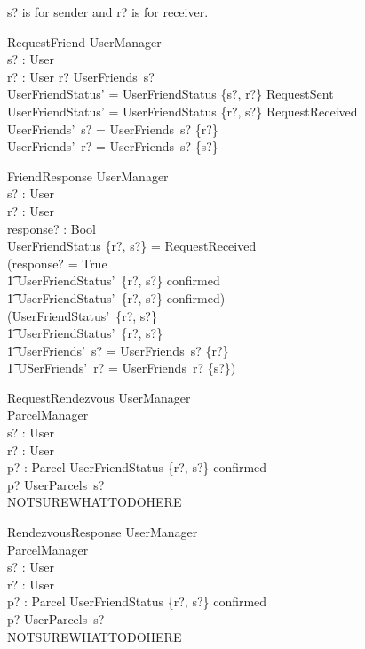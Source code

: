 \documentclass{article}
\begin{document}
s? is for sender and r? is for receiver.\\

\begin{schema}{RequestFriend}
	\Delta UserManager\\
	s? : User\\
	r? : User
	\where
	r? \notin UserFriends~s?\\
	UserFriendStatus' = UserFriendStatus \cup \{s?, r?\} \mapsto RequestSent\\
	UserFriendStatus' = UserFriendStatus \cup \{r?, s?\} \mapsto RequestReceived\\
	UserFriends'~s? = UserFriends~s? \cup \{r?\}\\
	UserFriends'~r? = UserFriends~s? \cup \{s?\}
\end{schema}

\begin{schema}{FriendResponse}
	\Delta UserManager\\
	s? : User\\
	r? : User\\
	response? : Bool\\
	\where
	UserFriendStatus \{r?, s?\} = RequestReceived\\
	(response? = True \land\\ 
		\t1 UserFriendStatus'~\{r?, s?\} \mapsto confirmed \land\\ 
		\t1 UserFriendStatus'~\{r?, s?\} \mapsto confirmed)\\
	\lor (UserFriendStatus'~\{r?, s?\} \mapsto \emptyset \land\\ 
		\t1 UserFriendStatus'~\{r?, s?\} \mapsto \emptyset \land\\
		\t1 UserFriends'~s? = UserFriends~s? \setminus \{r?\} \land\\
		\t1 USerFriends'~r? = UserFriends~r? \setminus \{s?\})
\end{schema}

\begin{schema}{RequestRendezvous}
	\Delta UserManager\\
	\Delta ParcelManager\\
	s? : User\\
	r? : User\\
	p? : Parcel
	\where
	UserFriendStatus \{r?, s?\} \mapsto confirmed\\
	p? \in UserParcels~s?\\
	NOTSUREWHATTODOHERE
\end{schema}

\begin{schema}{RendezvousResponse}
	\Delta UserManager\\
	\Delta ParcelManager\\
	s? : User\\
	r? : User\\
	p? : Parcel
	\where
	UserFriendStatus \{r?, s?\} \mapsto confirmed\\
	p? \in UserParcels~s?\\
	NOTSUREWHATTODOHERE
\end{schema}
\end{document}
